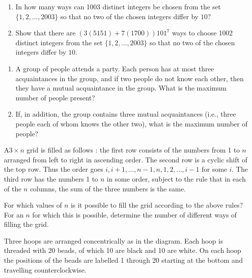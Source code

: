 \documentclass{pset}
\begin{document}
\begin{problems}
\begin{problem}[IrMO 2003 Q10]
    \begin{enumerate}
        \item In how many ways can 1003 distinct integers be chosen from the set \(\{1,2, \ldots, 2003\}\)
        so that no two of the chosen integers differ by \(10 ?\)
        \item Show that there are \((3(5151)+7(1700)) 101^{7}\) ways to choose 1002 distinct integers from the set \(\{1,2, \ldots, 2003\}\) so that no two of the chosen integers differ by \(10 .\)
    
    \end{enumerate}
    \end{problem}

\begin{problem}[IrMO 2002 Q2]
    \begin{enumerate}
    \item A group of people attends a party. Each person has at most three acquaintances in the group, and if two people do not know each other, then they have a mutual acquaintance in the group. What is the maximum number of people present?
    \item If, in addition, the group contains three mutual acquaintances (i.e., three people each of whom knows the other two), what is the maximum number of people?
    \end{enumerate}
\end{problem}

\begin{problem}[IrMO 2002 Q6]
    \(\mathrm{A} 3 \times n\) grid is filled as follows : the first row consists of the numbers from 1 to \(n\) arranged from left to right in ascending order. The second row is a cyclic shift of the top row. Thus the order goes \(i, i+1, \ldots, n-1, n, 1,2, \ldots, i-1\) for some \(i .\) The third row has the numbers 1 to \(n\) in some order, subject to the rule that in each of the \(n\) columns, the sum of the three numbers is the same.

    For which values of \(n\) is it possible to fill the grid according to the above rules? For an \(n\) for which this is possible, determine the number of different ways of filling the grid.
\end{problem}

\begin{problem}[IrMO 2001 Q7]
    Three hoops are arranged concentrically as in the diagram. Each hoop is threaded with 20 beads, of which 10 are black and 10 are white. On each hoop the positions of the beads are labelled 1 through 20 starting at the bottom and travelling counterclockwise.


\end{problem}
\end{problems}
\end{document}

